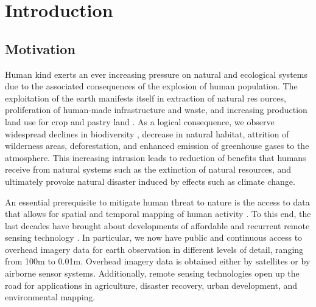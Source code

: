 
\chapter{Introduction}

\label{Chapter1}


\section{Motivation}

Human kind exerts an ever increasing pressure on natural and ecological systems due to the associated consequences of the explosion of human population. The exploitation of the earth manifests itself in extraction of natural res ources, proliferation of human-made infrastructure and waste, and increasing production land use for crop and pastry land \parencite{kareiva2007}. As a logical consequence, we observe widespread declines in biodiversity \parencite{newbold2015}, 
decrease in natural habitat, attrition of wilderness areas, deforestation, and enhanced emission of greenhouse gases to the atmosphere. This increasing intrusion leads to reduction of benefits that humans receive from natural systems \parencite{costanza2014} such as the extinction of natural resources, and ultimately provoke natural disaster induced by effects such as climate change. 

An essential prerequisite to mitigate human threat to nature is the access to data that allows for spatial and temporal mapping of human activity \parencite{raiter2014}. To this end, the last decades have brought about developments of affordable and recurrent remote sensing technology \parencite{hansen2013}. In particular, we now have public and continuous access to overhead imagery data for earth observation in different levels of detail, ranging from 100m to 0.01m. Overhead imagery data is obtained either by satellites or by airborne sensor systems. Additionally, remote sensing technologies open up the road for applications in agriculture, disaster recovery, urban development, and environmental mapping.

